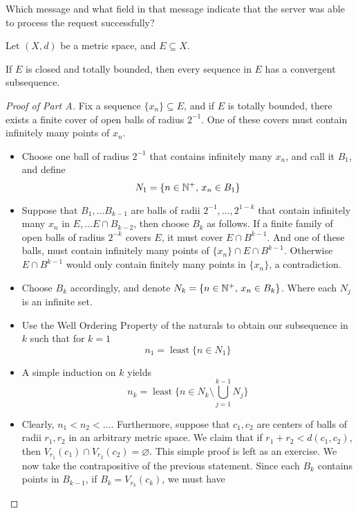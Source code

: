 \documentclass[../../main.tex]{subfiles}
\begin{document}
\begin{wts}
Which message and what field in that message indicate that the server was able to process the request successfully?  
\end{wts}
Let $(X,d)$ be a metric space, and $E\subseteq X$.
\begin{wts}
    If $E$ is closed and totally bounded, then every sequence in $E$ has a convergent subsequence.
\end{wts}
\begin{proof}[Proof of Part A]
    Fix a sequence $\{x_n\}\subseteq E$, and if $E$ is totally bounded, there exists a finite cover of open balls of radius $2^{-1}$. One of these covers must contain infinitely many points of $x_n$. 
    \begin{itemize}
        \item Choose one ball of radius $2^{-1}$ that contains infinitely many $x_n$, and call it $B_1$, and define
        \[
        N_1 = \{n\in\mathbb{N}^+,\, x_n\in B_1\}
        \]
        \item Suppose that $B_1,\ldots B_{k-1}$ are balls of radii $2^{-1},\ldots,2^{1-k}$ that contain infinitely many $x_n$ in $E,\ldots E\cap B_{k-2}$, then choose $B_k$ as follows. If a finite family of open balls of radius $2^{-k}$ covers $E$, it must cover $E\cap B^{k-1}$. And one of these balls, must contain infinitely many points of $\{x_n\}\cap E\cap B^{k-1}$. Otherwise $E\cap B^{k-1}$ would only contain finitely many points in $\{x_n\}$, a contradiction.
        \item Choose $B_k$ accordingly, and denote $N_k = \{n\in\mathbb{N}^+,\, x_n\in B_k\}$. Where each $N_j$ is an infinite set.
        \item Use the Well Ordering Property of the naturals to obtain our subsequence in $k$ such that for $k=1$
        \[
        n_1 = \operatorname{least}\biggl\{n\in N_1\biggr\}
        \]
        \item A simple induction on $k$ yields
        \[
        n_k = \operatorname{least}\biggl\{n\in N_k\setminus \bigcup^{k-1}_{j=1}N_j\biggr\}
        \]
        \item Clearly, $n_1<n_2<\ldots$. Furthermore, suppose that $c_1, c_2$ are centers of balls of radii $r_1, r_2$ in an arbitrary metric space. We claim that if $r_1 + r_2< d(c_1,c_2)$, then $V_{r_1}(c_1)\cap V_{r_2}(c_2)=\varnothing$. This simple proof is left as an exercise. We now take the contrapositive of the previous statement. Since each $B_k$ contains points in $B_{k-1}$, if $B_k = V_{r_k}(c_k)$, we must have

\end{itemize}
\end{proof}
\end{document}
